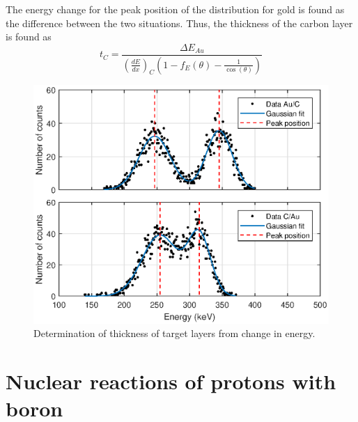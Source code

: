 The energy change for the peak position of the distribution for gold is found as the difference between the two situations. Thus, the thickness of the carbon layer is found as 
\begin{equation}
t_C = \frac{\Delta E_{Au}}{\left(\frac{dE}{dx}\right)_C \left(1 - f_E(\theta) - \frac{1}{\cos(\theta)} \right)}
\end{equation}



\begin{figure}[t]
\centering
\includegraphics[width=0.99\columnwidth]{Dterminethicknessplot.eps}
\caption{Determination of thickness of target layers from change in energy.}
\label{fig_thickness}
\end{figure}



\section{Nuclear reactions of protons with boron}

